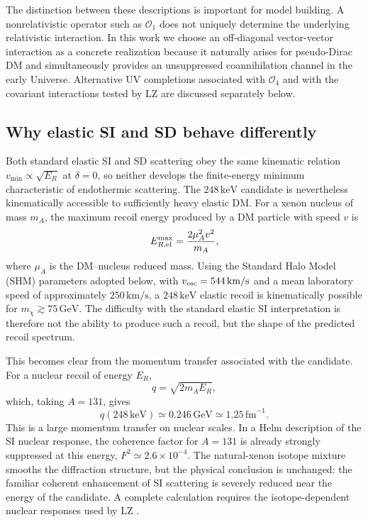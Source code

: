 \documentclass[aps,prd,reprint,superscriptaddress,nofootinbib,longbibliography,floatfix]{revtex4-2}
\newcommand{\GeV}{\mathrm{GeV}}
\newcommand{\keV}{\mathrm{keV}}
\begin{document}
The distinction between these descriptions is important for model building. A nonrelativistic operator such as $\mathcal{O}_1$ does not uniquely determine the underlying relativistic interaction. In this work we choose an off-diagonal vector-vector interaction as a concrete realization because it naturally arises for pseudo-Dirac DM and simultaneously provides an unsuppressed coannihilation channel in the early Universe. Alternative UV completions associated with $\mathcal{O}_4$ and with the covariant interactions tested by LZ are discussed separately below.



\subsection{Why elastic SI and SD behave differently}
\label{sec:elasticdiagnostic}

Both standard elastic SI and SD scattering obey the same kinematic relation $v_{\min}\propto\sqrt{E_R}$ at $\delta=0$, so neither develops the finite-energy minimum characteristic of endothermic scattering. The $248\,\keV$ candidate is nevertheless kinematically accessible to sufficiently heavy elastic DM. For a xenon nucleus of mass $m_A$, the maximum recoil energy produced by a DM particle with speed $v$ is
\begin{equation}
E_{R,\rm el}^{\max}=\frac{2\mu_A^2v^2}{m_A},
\end{equation}
where $\mu_A$ is the DM--nucleus reduced mass. Using the Standard Halo Model (SHM) parameters adopted below, with $v_{\rm esc}=544\,\mathrm{km/s}$
and a mean laboratory speed of approximately $250\,\mathrm{km/s}$,
a $248\,\keV$ elastic recoil is kinematically possible for
$m_\chi\gtrsim75\,\GeV$. The difficulty with the standard elastic SI interpretation is therefore not the ability to produce such a recoil, but the shape of the predicted recoil spectrum.

This becomes clear from the momentum transfer associated with the candidate. For a nuclear recoil of energy $E_R$,
\begin{equation}
q=\sqrt{2m_AE_R},
\end{equation}
which, taking $A=131$, gives
\begin{equation}
q(248\,\keV)\simeq0.246\,\GeV\simeq1.25\,\mathrm{fm}^{-1}.
\end{equation}
This is a large momentum transfer on nuclear scales. In a Helm description of the SI nuclear response, the coherence factor for $A=131$ is already strongly suppressed at this energy, $F^2\simeq2.6\times10^{-4}$. The natural-xenon isotope mixture smooths the diffraction structure, but the physical conclusion is unchanged: the familiar coherent enhancement of SI scattering is severely reduced near the energy of the candidate. A complete calculation requires the isotope-dependent nuclear responses used by
LZ \cite{Fitzpatrick2013,Anand2014,LZ2026Extended}.
\end{document}
